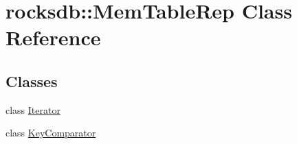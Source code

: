 \hypertarget{classrocksdb_1_1MemTableRep}{}\section{rocksdb\+:\+:Mem\+Table\+Rep Class Reference}
\label{classrocksdb_1_1MemTableRep}
\subsection*{Classes}
\begin{DoxyCompactItemize}
\item 
class \hyperlink{classrocksdb_1_1MemTableRep_1_1Iterator}{Iterator}
\item 
class \hyperlink{classrocksdb_1_1MemTableRep_1_1KeyComparator}{Key\+Comparator}
\end{DoxyCompactItemize}

